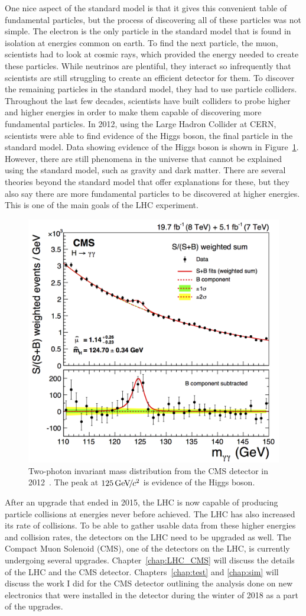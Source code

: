 One nice aspect of the standard model is that it gives this convenient table of fundamental particles, but the process of discovering all of these particles was not simple. The electron is the only particle in the standard model that is found in isolation at energies common on earth. To find the next particle, the muon, scientists had to look at cosmic rays, which provided the energy needed to create these particles. While neutrinos are plentiful, they interact so infrequently that scientists are still struggling to create an efficient detector for them. To discover the remaining particles in the standard model, they had to use particle colliders. Throughout the last few decades, scientists have built colliders to probe higher and higher energies in order to make them capable of discovering more fundamental particles. In 2012, using the Large Hadron Collider at CERN, scientists were able to find evidence of the Higgs boson, the final particle in the standard model. Data showing evidence of the Higgs boson is shown in Figure~\ref{fig:higgs}. However, there are still phenomena in the universe that cannot be explained using the standard model, such as gravity and dark matter. There are several theories beyond the standard model that offer explanations for these, but they also say there are more fundamental particles to be discovered at higher energies. This is one of the main goals of the LHC experiment. 

\begin{figure}
\centering
\includegraphics[width=0.6\linewidth]{Figures/higgsmeasurement.png}
\caption{Two-photon invariant mass distribution from the CMS detector in 2012~\cite{CMS_Higgs_Discovery}. The peak at $125{\,\text{Ge\hspace{-.08em}V\hspace{-0.16em}/\hspace{-0.08em}}c^\text{2}}$ is evidence of the Higgs boson.}
\label{fig:higgs}
\end{figure} 


After an upgrade that ended in 2015, the LHC is now capable of producing particle collisions at energies never before achieved. The LHC has also increased its rate of collisions. To be able to gather usable data from these higher energies and collision rates, the detectors on the LHC need to be upgraded as well. The Compact Muon Solenoid (CMS), one of the detectors on the LHC, is currently undergoing several upgrades. Chapter~\ref{chap:LHC_CMS} will discuss the details of the LHC and the CMS detector. Chapters~\ref{chap:test} and \ref{chap:sim} will discuss the work I did for the CMS detector outlining the analysis done on new electronics that were installed in the detector during the winter of 2018 as a part of the upgrades.

